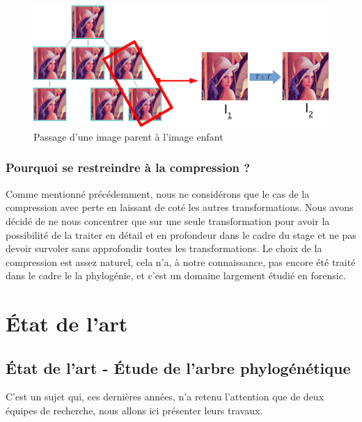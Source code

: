 \documentclass[utf8]{stageM2R} %
\begin{document}
\begin{figure}
  \begin{center}
    \includegraphics[width=120mm]{images/tree_extract}
    \caption{Passage d'une image parent à l'image enfant}
    \label{fig:tree_extract}
  \end{center}
\end{figure}

\subsection{Pourquoi se restreindre à la compression ?}
Comme mentionné précédemment, nous ne considérons que le cas de la compression avec perte en laissant de coté les autres transformations. Nous avons décidé de ne nous concentrer que sur une seule transformation pour avoir la possibilité de la traiter en détail et en profondeur dans le cadre du stage et ne pas devoir survoler sans approfondir toutes les transformations. Le choix de la compression est assez naturel, cela n'a, à notre connaissance, pas encore été traité dans le cadre le la phylogénie, et c'est un domaine largement étudié en forensic.

\chapter{État de l'art}
\section{État de l'art - Étude de l'arbre phylogénétique}
C'est un sujet qui, ces dernières années, n'a retenu l'attention que de deux équipes de recherche, nous allons ici présenter leurs travaux.
\end{document}

